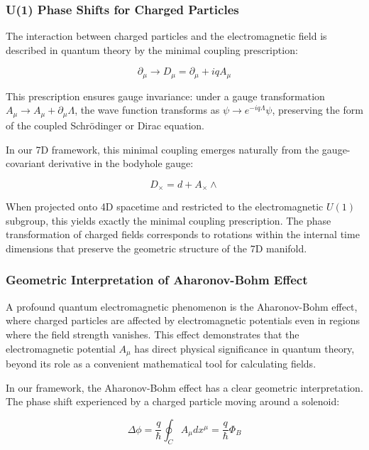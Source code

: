 \documentclass{article}
\begin{document}
\subsubsection{U(1) Phase Shifts for Charged Particles}

The interaction between charged particles and the electromagnetic field is described in quantum theory by the minimal coupling prescription:

\begin{equation}
\partial_{\mu} \rightarrow D_{\mu} = \partial_{\mu} + iqA_{\mu}
\end{equation}

This prescription ensures gauge invariance: under a gauge transformation $A_{\mu} \rightarrow A_{\mu} + \partial_{\mu}\Lambda$, the wave function transforms as $\psi \rightarrow e^{-iq\Lambda}\psi$, preserving the form of the coupled Schrödinger or Dirac equation.

In our 7D framework, this minimal coupling emerges naturally from the gauge-covariant derivative in the bodyhole gauge:

\begin{equation}
D_{\times} = d + A_{\times} \wedge
\end{equation}

When projected onto 4D spacetime and restricted to the electromagnetic $U(1)$ subgroup, this yields exactly the minimal coupling prescription. The phase transformation of charged fields corresponds to rotations within the internal time dimensions that preserve the geometric structure of the 7D manifold.

\subsubsection{Geometric Interpretation of Aharonov-Bohm Effect}

A profound quantum electromagnetic phenomenon is the Aharonov-Bohm effect, where charged particles are affected by electromagnetic potentials even in regions where the field strength vanishes. This effect demonstrates that the electromagnetic potential $A_{\mu}$ has direct physical significance in quantum theory, beyond its role as a convenient mathematical tool for calculating fields.

In our framework, the Aharonov-Bohm effect has a clear geometric interpretation. The phase shift experienced by a charged particle moving around a solenoid:

\begin{equation}
\Delta\phi = \frac{q}{\hbar} \oint_C A_{\mu} dx^{\mu} = \frac{q}{\hbar} \Phi_B
\end{equation}
\end{document}
